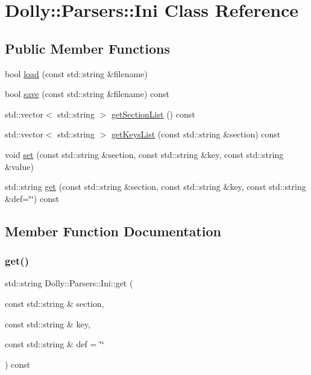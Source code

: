 \hypertarget{class_dolly_1_1_parsers_1_1_ini}{}\section{Dolly\+:\+:Parsers\+:\+:Ini Class Reference}
\label{class_dolly_1_1_parsers_1_1_ini}
\subsection*{Public Member Functions}
\begin{DoxyCompactItemize}
\item 
bool \hyperlink{class_dolly_1_1_parsers_1_1_ini_ad8315b663c209a05664b2b0d4df4fcb7}{load} (const std\+::string \&filename)
\item 
bool \hyperlink{class_dolly_1_1_parsers_1_1_ini_a706c4dcbe74e09cb12c224d32c53afc1}{save} (const std\+::string \&filename) const
\item 
std\+::vector$<$ std\+::string $>$ \hyperlink{class_dolly_1_1_parsers_1_1_ini_a0e3dcec1db12ef0f031c217ca5080d9e}{get\+Section\+List} () const
\item 
std\+::vector$<$ std\+::string $>$ \hyperlink{class_dolly_1_1_parsers_1_1_ini_a0baf943bec811d90b3842ecf43358128}{get\+Keys\+List} (const std\+::string \&section) const
\item 
void \hyperlink{class_dolly_1_1_parsers_1_1_ini_a86d11b952d38230e35b2b1a3c032aa4f}{set} (const std\+::string \&section, const std\+::string \&key, const std\+::string \&value)
\item 
std\+::string \hyperlink{class_dolly_1_1_parsers_1_1_ini_a447b016bca7b36f435f5c7a6f4a444e4}{get} (const std\+::string \&section, const std\+::string \&key, const std\+::string \&def=\char`\"{}\char`\"{}) const
\end{DoxyCompactItemize}


\subsection{Member Function Documentation}
\mbox{\label{class_dolly_1_1_parsers_1_1_ini_a447b016bca7b36f435f5c7a6f4a444e4}} 
\subsubsection{\texorpdfstring{get()}{get()}}
{\footnotesize\ttfamily std\+::string Dolly\+::\+Parsers\+::\+Ini\+::get (\begin{DoxyParamCaption}\item[{const std\+::string \&}]{section,  }\item[{const std\+::string \&}]{key,  }\item[{const std\+::string \&}]{def = {\ttfamily \char`\"{}\char`\"{}} }\end{DoxyParamCaption}) const}


